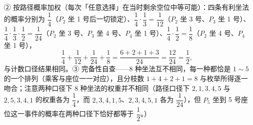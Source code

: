 \begin{answer}
② 按路径概率加权（每次「任意选择」在当时剩余空位中等可能）：四条有利坐法的概率分别为 \(\dfrac{1}{4}\)（\(P_{2}\) 坐 1 号后一切锁定）、\(\dfrac{1}{4}\cdot\dfrac{1}{3}=\dfrac{1}{12}\)（\(P_{2}\) 坐 3 号、\(P_{3}\) 坐 1 号）、\(\dfrac{1}{4}\cdot\dfrac{1}{3}\cdot\dfrac{1}{2}=\dfrac{1}{24}\)（\(P_{2}\) 坐 3 号、\(P_{3}\) 坐 4 号、\(P_{4}\) 坐 1 号）、\(\dfrac{1}{4}\cdot\dfrac{1}{2}=\dfrac{1}{8}\)（\(P_{2}\) 坐 4 号、\(P_{4}\) 坐 1 号），
\nopagebreak[4]
\[
\frac{1}{4}+\frac{1}{12}+\frac{1}{24}+\frac{1}{8}=\frac{6+2+1+3}{24}=\frac{12}{24}=\frac{1}{2},
\]
与计数口径结果相同。③ 完备性自查——8 种坐法互不相同，每一种都恰是 \(1\sim5\) 的一个排列（乘客与座位一一对应），且分枝数 \(1+4+2+1=8\) 与枚举所得逐一吻合；注意两种口径下 8 种坐法的权重并不相同（路径口径下 \(2,1,3,4,5\) 与 \(2,5,3,4,1\) 的权重各为 \(\dfrac{1}{4}\)，而 \(2,3,4,1,5\)、\(2,3,4,5,1\) 各为 \(\dfrac{1}{24}\)），但 \(P_{5}\) 坐到 5 号座位这一事件的概率在两种口径下恰好都等于 \(\dfrac{1}{2}\)。）



\end{answer}
